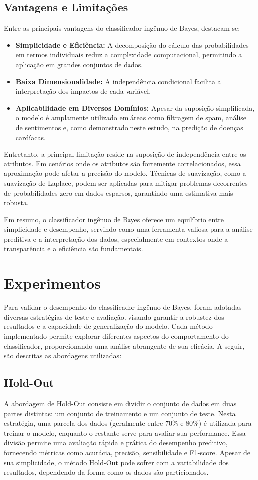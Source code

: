 \documentclass[conference]{IEEEtran}
\begin{document}
\subsection{Vantagens e Limitações}
Entre as principais vantagens do classificador ingênuo de Bayes, destacam-se:
\begin{itemize}
    \item \textbf{Simplicidade e Eficiência:} A decomposição do cálculo das probabilidades em termos individuais reduz a complexidade computacional, permitindo a aplicação em grandes conjuntos de dados.
    \item \textbf{Baixa Dimensionalidade:} A independência condicional facilita a interpretação dos impactos de cada variável.
    \item \textbf{Aplicabilidade em Diversos Domínios:} Apesar da suposição simplificada, o modelo é amplamente utilizado em áreas como filtragem de spam, análise de sentimentos e, como demonstrado neste estudo, na predição de doenças cardíacas.
\end{itemize}

Entretanto, a principal limitação reside na suposição de independência entre os atributos. Em cenários onde os atributos são fortemente correlacionados, essa aproximação pode afetar a precisão do modelo. Técnicas de suavização, como a suavização de Laplace, podem ser aplicadas para mitigar problemas decorrentes de probabilidades zero em dados esparsos, garantindo uma estimativa mais robusta.

Em resumo, o classificador ingênuo de Bayes oferece um equilíbrio entre simplicidade e desempenho, servindo como uma ferramenta valiosa para a análise preditiva e a interpretação dos dados, especialmente em contextos onde a transparência e a eficiência são fundamentais.

\section{Experimentos}
Para validar o desempenho do classificador ingênuo de Bayes, foram adotadas diversas estratégias de teste e avaliação, visando garantir a robustez dos resultados e a capacidade de generalização do modelo. Cada método implementado permite explorar diferentes aspectos do comportamento do classificador, proporcionando uma análise abrangente de sua eficácia. A seguir, são descritas as abordagens utilizadas:

\subsection{Hold-Out}
A abordagem de Hold-Out consiste em dividir o conjunto de dados em duas partes distintas: um conjunto de treinamento e um conjunto de teste. Nesta estratégia, uma parcela dos dados (geralmente entre 70\% e 80\%) é utilizada para treinar o modelo, enquanto o restante serve para avaliar sua performance. Essa divisão permite uma avaliação rápida e prática do desempenho preditivo, fornecendo métricas como acurácia, precisão, sensibilidade e F1-score. Apesar de sua simplicidade, o método Hold-Out pode sofrer com a variabilidade dos resultados, dependendo da forma como os dados são particionados.
\end{document}
